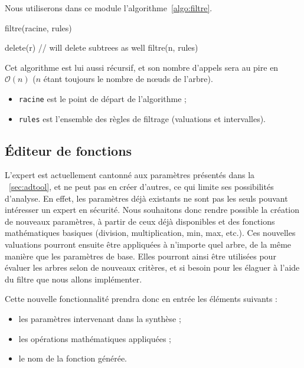 		Nous utiliserons dans ce module l'algorithme~\ref{algo:filtre}. 
		\begin{algorithm}[h!]
			\caption{filtre(racine, rules)}
			\label{algo:filtre}
			\begin{algorithmic}
						\STATE delete(r) // will delete subtrees as well
						\RETURN
					\ENDIF
				\ENDFOR
				\STATE
					\STATE filtre(n, rules)
				\ENDFOR
			\end{algorithmic}
		\end{algorithm}
		Cet algorithme est lui aussi récursif, et son nombre d'appels sera au pire en $\mathcal{O}(n)$ ($n$ étant toujours le nombre de nœuds de l'arbre).
		\begin{itemize}
			\item \verb|racine| est le point de départ de l'algorithme ;
			\item \verb|rules| est l'ensemble des règles de filtrage (valuations et intervalles).
		\end{itemize}
	

		\subsection{Éditeur de fonctions}
			\label{subsection:synthese} 

			L'expert est actuellement cantonné aux paramètres présentés dans la {}~\ref{sec:adtool}, et ne peut pas en créer d'autres, ce qui limite ses possibilités d'analyse. En effet, les paramètres déjà existants ne sont pas les seuls pouvant intéresser un expert en sécurité. Nous souhaitons donc rendre possible la création de nouveaux paramètres, à partir de ceux déjà disponibles et des fonctions mathématiques basiques (division, multiplication, min, max, etc.). Ces nouvelles valuations pourront ensuite être appliquées à n'importe quel arbre, de la même manière que les paramètres de base. Elles pourront ainsi être utilisées pour évaluer les arbres selon de nouveaux critères, et si besoin pour les élaguer à l'aide du filtre que nous allons implémenter.

			Cette nouvelle fonctionnalité prendra donc en entrée les éléments suivants :
			\begin{itemize}
				\item les paramètres intervenant dans la synthèse ;
				\item les opérations mathématiques appliquées ;
				\item le nom de la fonction générée.
			\end{itemize}

